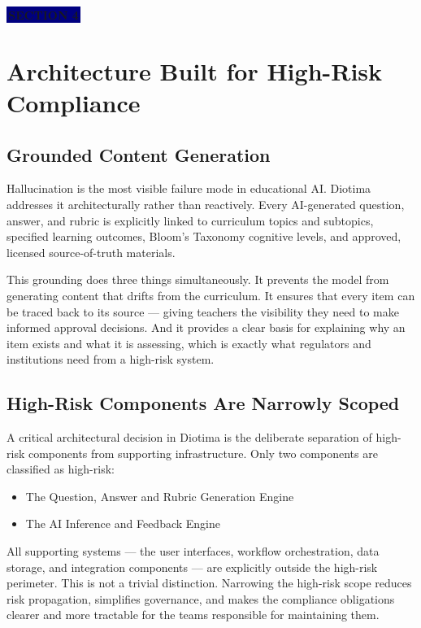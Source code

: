 \documentclass[11pt, a4paper]{article}
\newcommand{\sectiontag}[1]{%
  \vspace{4pt}%
  {\color{white}\colorbox{navy}{\small\bfseries\,#1\,}}%
  \vspace{6pt}%
}
\begin{document}
\sectiontag{SECTION 4}

\section{Architecture Built for High-Risk Compliance}

\subsection{Grounded Content Generation}

Hallucination is the most visible failure mode in educational AI. Diotima addresses it architecturally rather than reactively. Every AI-generated question, answer, and rubric is explicitly linked to curriculum topics and subtopics, specified learning outcomes, Bloom's Taxonomy cognitive levels, and approved, licensed source-of-truth materials.

This grounding does three things simultaneously. It prevents the model from generating content that drifts from the curriculum. It ensures that every item can be traced back to its source --- giving teachers the visibility they need to make informed approval decisions. And it provides a clear basis for explaining why an item exists and what it is assessing, which is exactly what regulators and institutions need from a high-risk system.

\subsection{High-Risk Components Are Narrowly Scoped}

A critical architectural decision in Diotima is the deliberate separation of high-risk components from supporting infrastructure. Only two components are classified as high-risk:

\begin{itemize}
  \item The Question, Answer and Rubric Generation Engine
  \item The AI Inference and Feedback Engine
\end{itemize}

All supporting systems --- the user interfaces, workflow orchestration, data storage, and integration components --- are explicitly outside the high-risk perimeter. This is not a trivial distinction. Narrowing the high-risk scope reduces risk propagation, simplifies governance, and makes the compliance obligations clearer and more tractable for the teams responsible for maintaining them.
\end{document}
